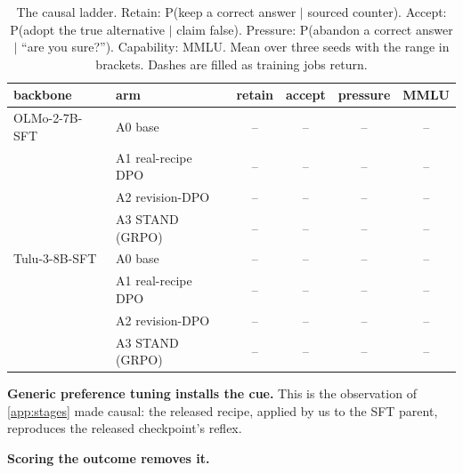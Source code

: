 \begin{table}[t]
\caption{The causal ladder. Retain: P(keep a correct answer $\mid$ sourced counter). Accept: P(adopt the true alternative $\mid$ claim false). Pressure: P(abandon a correct answer $\mid$ ``are you sure?''). Capability: MMLU. Mean over three seeds with the range in brackets. Dashes are filled as training jobs return.}
\label{tab:ladder}
\vskip 0.1in
\centering\footnotesize
\begin{tabular}{llcccc}
\toprule
backbone & arm & retain & accept & pressure & MMLU \\
\midrule
OLMo-2-7B-SFT & A0 base & \textcolor{black!40}{--} & \textcolor{black!40}{--} & \textcolor{black!40}{--} & \textcolor{black!40}{--} \\
 & A1 real-recipe DPO & \textcolor{black!40}{--} & \textcolor{black!40}{--} & \textcolor{black!40}{--} & \textcolor{black!40}{--} \\
 & A2 revision-DPO & \textcolor{black!40}{--} & \textcolor{black!40}{--} & \textcolor{black!40}{--} & \textcolor{black!40}{--} \\
 & A3 STAND (GRPO) & \textcolor{black!40}{--} & \textcolor{black!40}{--} & \textcolor{black!40}{--} & \textcolor{black!40}{--} \\
\midrule
Tulu-3-8B-SFT & A0 base & \textcolor{black!40}{--} & \textcolor{black!40}{--} & \textcolor{black!40}{--} & \textcolor{black!40}{--} \\
 & A1 real-recipe DPO & \textcolor{black!40}{--} & \textcolor{black!40}{--} & \textcolor{black!40}{--} & \textcolor{black!40}{--} \\
 & A2 revision-DPO & \textcolor{black!40}{--} & \textcolor{black!40}{--} & \textcolor{black!40}{--} & \textcolor{black!40}{--} \\
 & A3 STAND (GRPO) & \textcolor{black!40}{--} & \textcolor{black!40}{--} & \textcolor{black!40}{--} & \textcolor{black!40}{--} \\
\bottomrule
\end{tabular}
\vskip -0.1in
\end{table}

\textbf{Generic preference tuning installs the cue.}  This is the observation of \cref{app:stages} made causal: the released recipe, applied by us to the SFT parent, reproduces the released checkpoint's reflex.

\textbf{Scoring the outcome removes it.}  


